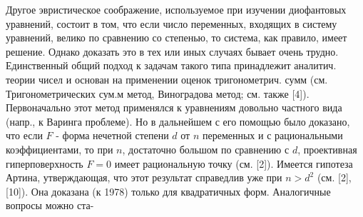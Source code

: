 \documentclass[10pt]{article}
\begin{document}
Другое эвристическое соображение, используемое при изучении диофантовых уравнений, состоит в том, что если число переменных, входящих в систему уравнений, велико по сравнению со степенью, то система, как правило, имеет решение. Однако доказать это в тех или иных случаях бывает очень трудно. Единственный общий подход к задачам такого типа принадлежит аналитич. теории чисел и основан на применении оценок тригонометрич. сумм (см. Тригонометрических сум.м метод, Виноградова метод; см. также [4]). Первоначально этот метод применялся к уравнениям довольно частного вида (напр., к Варинга проблеме). Но в дальнейшем с его помощью было доказано, что если $F$ - форма нечетной степени $d$ от $n$ переменных и с рациональными коэффициентами, то при $n$, достаточно большом по сравнению с $d$, проективная гиперповерхность $F=0$ имеет рациональную точку (см. [2]). Имеется гипотеза Артина, утверждающая, что этот результат справедлив уже при $n>d^{2}$ (см. [2], [10]). Она доказана (к 1978) только для квадратичных форм. Аналогичные вопросы можно ста-
\end{document}
